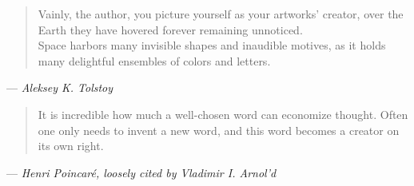%
\cleardoublepage
\thispagestyle{empty}


\begin{quote}
Vainly, the author, you picture yourself as your artworks’ creator,
over the Earth they have hovered forever remaining unnoticed.\\
Space harbors many invisible shapes and inaudible motives,
as it holds many delightful ensembles of colors and letters.
\end{quote}
--- \emph{Aleksey K. Tolstoy}
\vspace{2cm}
\begin{quote}
    It is incredible how much a well-chosen word can economize
    thought. Often one only needs to invent a new word, and this word becomes
    a creator on its own right.
\end{quote}
--- \emph{Henri Poincaré, loosely cited by Vladimir I. Arnol'd}

\clearemptydoublepage
